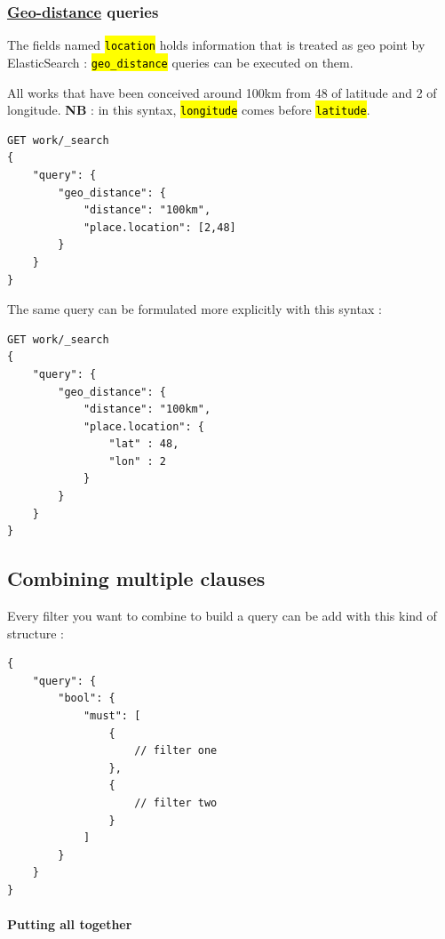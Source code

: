 \documentclass[a4paper,12pt,twoside]{book}
\let\OldTexttt\texttt
\renewcommand{\texttt}[1]{\OldTexttt{\hl{#1}}}
\let\quoteOld\quote
\let\endquoteOld\endquote
\renewenvironment{quote}{\small\quoteOld}{\endquoteOld}
\begin{document}
			\subsubsection{\href{https://www.elastic.co/guide/en/elasticsearch/reference/current/query-dsl-geo-distance-query.html}{Geo-distance} queries}\label{geo-distance-queries}

The fields named \texttt{location} holds information that is treated as geo point by ElasticSearch : \texttt{geo\_distance} queries can be executed on them.

\begin{quote}
	All works that have been conceived around 100km from 48 of latitude and 2 of longitude. \textbf{NB} : in this syntax, \texttt{longitude} comes before \texttt{latitude}.
\end{quote}

\begin{lstlisting}
GET work/_search
{
    "query": {
        "geo_distance": {
            "distance": "100km",
            "place.location": [2,48]
        }
    }
}
\end{lstlisting}

The same query can be formulated more explicitly with this syntax :

\begin{lstlisting}
GET work/_search
{
    "query": {
        "geo_distance": {
            "distance": "100km",
            "place.location": {
                "lat" : 48,
                "lon" : 2
            }
        }
    }
}
\end{lstlisting}

		\subsection{Combining multiple clauses}\label{combining-multiple-clauses}

Every filter you want to combine to build a query can be add with this kind of structure :

\begin{lstlisting}
{
    "query": {
        "bool": {
            "must": [
                {
                    // filter one
                },
                {
                    // filter two
                }
            ]
        }
    }
}
\end{lstlisting}

				\paragraph{Putting all together}\label{putting-all-together}
\end{document}
